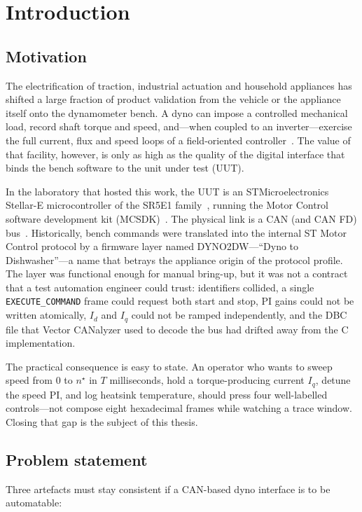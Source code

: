 \chapter{Introduction}
\label{ch:intro}

\section{Motivation}
The electrification of traction, industrial actuation and household appliances
has shifted a large fraction of product validation from the vehicle or the
appliance itself onto the dynamometer bench. A dyno can impose a controlled
mechanical load, record shaft torque and speed, and---when coupled to an
inverter---exercise the full current, flux and speed loops of a
field-oriented controller~\cite{isermann2014engine,krishnan2010pmsm}. The
value of that facility, however, is only as high as the quality of the
digital interface that binds the bench software to the unit under test
(UUT).

In the laboratory that hosted this work, the UUT is an STMicroelectronics
Stellar-E microcontroller of the SR5E1 family~\cite{ststellar}, running the
Motor Control software development kit (MCSDK)~\cite{stmcsdk}. The physical
link is a CAN (and CAN FD) bus~\cite{iso11898,bosch1991can}. Historically,
bench commands were translated into the internal ST Motor Control protocol
by a firmware layer named DYNO2DW---``Dyno to Dishwasher''---a name that
betrays the appliance origin of the protocol profile. The layer was
functional enough for manual bring-up, but it was not a contract that a
test automation engineer could trust: identifiers collided, a single
\texttt{EXECUTE\_COMMAND} frame could request both start and stop, PI gains
could not be written atomically, $I_d$ and $I_q$ could not be ramped
independently, and the DBC file that Vector CANalyzer used to decode the bus
had drifted away from the C implementation.

The practical consequence is easy to state. An operator who wants to sweep
speed from $0$ to $n^\star$ in $T$ milliseconds, hold a torque-producing
current $I_q$, detune the speed PI, and log heatsink temperature, should
press four well-labelled controls---not compose eight hexadecimal frames
while watching a trace window. Closing that gap is the subject of this
thesis.

\section{Problem statement}
Three artefacts must stay consistent if a CAN-based dyno interface is to be
automatable:

